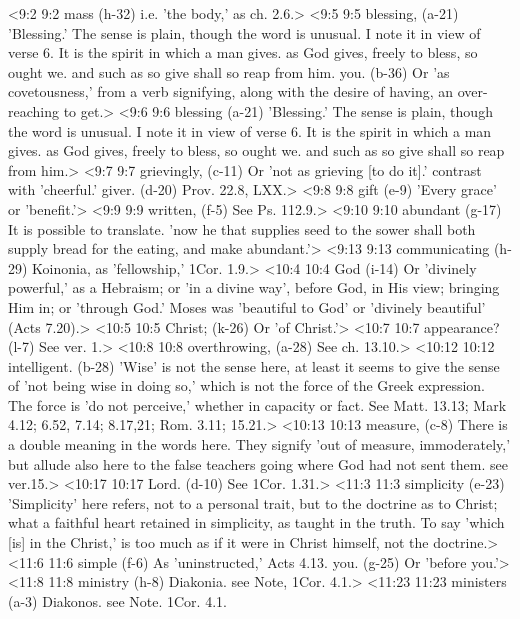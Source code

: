 <9:2 9:2  mass (h-32)  i.e. 'the body,' as ch. 2.6.>
<9:5 9:5  blessing, (a-21)  'Blessing.' The sense is plain, though the word is unusual. I  note it in view of verse 6. It is the spirit in which a man  gives. as God gives, freely to bless, so ought we. and such as  so give shall so reap from him.
  you. (b-36)  Or 'as covetousness,' from a verb signifying, along with the  desire of having, an over-reaching to get.>
<9:6 9:6  blessing (a-21)  'Blessing.' The sense is plain, though the word is unusual. I  note it in view of verse 6. It is the spirit in which a man  gives. as God gives, freely to bless, so ought we. and such as  so give shall so reap from him.>
<9:7 9:7  grievingly, (c-11)  Or 'not as grieving [to do it].' contrast with 'cheerful.'
  giver. (d-20)  Prov. 22.8, LXX.>
<9:8 9:8  gift (e-9)  'Every grace' or 'benefit.'>
<9:9 9:9  written, (f-5)  See Ps. 112.9.>
<9:10 9:10  abundant (g-17)  It is possible to translate. 'now he that supplies seed to  the sower shall both supply bread for the eating, and make  abundant.'>
<9:13 9:13  communicating (h-29)  Koinonia, as 'fellowship,' 1Cor. 1.9.>
<10:4 10:4  God (i-14)  Or 'divinely powerful,' as a Hebraism; or 'in a divine way',  before God, in His view; bringing Him in; or 'through God.'  Moses was 'beautiful to God' or 'divinely beautiful' (Acts 7.20).>
<10:5 10:5  Christ; (k-26)  Or 'of Christ.'>
<10:7 10:7  appearance? (l-7)  See ver. 1.>
<10:8 10:8  overthrowing, (a-28)  See ch. 13.10.>
<10:12 10:12  intelligent. (b-28)  'Wise' is not the sense here, at least it seems to give the  sense of 'not being wise in doing so,' which is not the force  of the Greek expression. The force is 'do not perceive,'  whether in capacity or fact. See Matt. 13.13; Mark 4.12; 6.52,  7.14; 8.17,21; Rom. 3.11; 15.21.>
<10:13 10:13  measure, (c-8)  There is a double meaning in the words here. They signify  'out of measure, immoderately,' but allude also here to the  false teachers going where God had not sent them. see ver.15.>
<10:17 10:17  Lord. (d-10)  See 1Cor. 1.31.>
<11:3 11:3  simplicity (e-23)  'Simplicity' here refers, not to a personal trait, but to the  doctrine as to Christ; what a faithful heart retained in  simplicity, as taught in the truth. To say 'which [is] in the  Christ,' is too much as if it were in Christ himself, not the  doctrine.>
<11:6 11:6  simple (f-6)  As 'uninstructed,' Acts 4.13.
  you. (g-25)  Or 'before you.'>
<11:8 11:8  ministry (h-8)  Diakonia. see Note, 1Cor. 4.1.>
<11:23 11:23  ministers (a-3)  Diakonos. see Note. 1Cor. 4.1.
